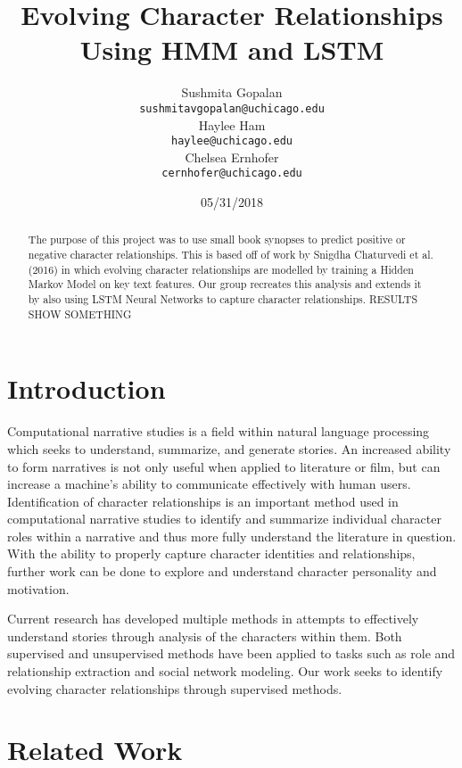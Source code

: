 \documentclass[11pt,a4paper]{article}
\title{Evolving Character Relationships Using HMM and LSTM}
\author{Sushmita Gopalan \\
  {\tt sushmitavgopalan@uchicago.edu} \\\And
  Haylee Ham \\
  {\tt haylee@uchicago.edu} \\\And
  Chelsea Ernhofer \\
  {\tt cernhofer@uchicago.edu} \\}
\date{05/31/2018}
\begin{document}
\maketitle
\begin{abstract}
  The purpose of this project was to use small book synopses to predict positive or negative character relationships. This is based off of work by Snigdha Chaturvedi et al. (2016) in which evolving character relationships are modelled by training a Hidden Markov Model on key text features. Our group recreates this analysis and extends it by also using LSTM Neural Networks to capture character relationships. RESULTS SHOW SOMETHING  
\end{abstract}

\section{Introduction}

Computational narrative studies is a field within natural language processing which seeks to understand, summarize, and generate stories. An increased ability to form narratives is not only useful when applied to literature or film, but can increase a machine's ability to communicate effectively with human users. Identification of character relationships is an important method used in computational narrative studies to identify and summarize individual character roles within a narrative and thus more fully understand the literature in question. With the ability to properly capture character identities and relationships, further work can be done to explore and understand character personality and motivation.

Current research has developed multiple methods in attempts to effectively understand stories through analysis of the characters within them.  Both supervised and unsupervised methods have been applied to tasks such as role and relationship extraction and social network modeling. Our work seeks to identify evolving character relationships through supervised methods. 

\section{Related Work}
\end{document}
